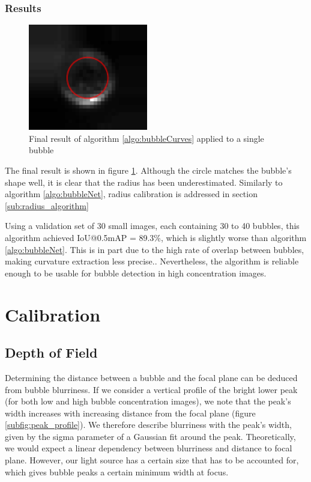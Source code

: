 			\subsubsection{Results}

				\begin{figure}
					\centering
					\includegraphics[scale=1]{images/bubbleCurve_final_result.png}
					\caption{Final result of algorithm \ref{algo:bubbleCurves} applied to a single bubble}
					\label{fig:final_result}
				\end{figure}
				
				The final result is shown in figure \ref{fig:final_result}. Although the circle matches the bubble's shape well, it is clear that the radius has been underestimated. Similarly to algorithm \ref{algo:bubbleNet}, radius calibration is addressed in section \ref{sub:radius_algorithm}
				
				Using a validation set of 30 small images, each containing 30 to 40 bubbles, this algorithm achieved IoU@0.5mAP = 89.3\%, which is slightly worse than algorithm \ref{algo:bubbleNet}. This is in part due to the high rate of overlap between bubbles, making curvature extraction less precise.. Nevertheless, the algorithm is reliable enough to be usable for bubble detection in high concentration images.
				

	
	
	
	
	\section{Calibration}\label{calibration_algorithm}
		\subsection{Depth of Field}
			Determining the distance between a bubble and the focal plane can be deduced from bubble blurriness. If we consider a vertical profile of the bright lower peak (for both low and high bubble concentration images), we note that the peak's width increases with increasing distance from the focal plane (figure \ref{subfig:peak_profile}). We therefore describe blurriness with the peak's width, given by the sigma parameter of a Gaussian fit around the peak. Theoretically, we would expect a linear dependency between blurriness and distance to focal plane. However, our light source has a certain size that has to be accounted for, which gives bubble peaks a certain minimum width at focus. 
			
